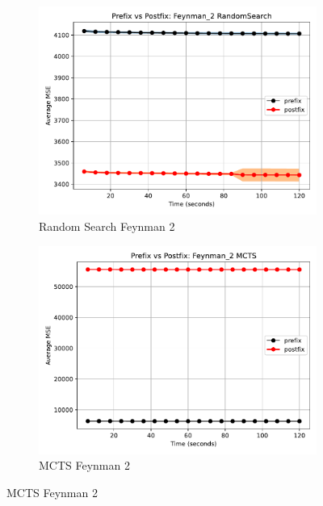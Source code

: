 \documentclass[12pt]{iopart}
\begin{document}
\begin{figure}
    \centering
    
    \begin{subfigure}[b]{0.4\textwidth}
        \includegraphics[width=\linewidth, keepaspectratio]{AIFeynman_Benchmarks/PrePostFeynman_2RandomSearch.pdf}
        \caption{Random Search Feynman 2}
        \label{subfig:feynman_2_RS}
    \end{subfigure}
    \begin{subfigure}[b]{0.4\textwidth}
        \includegraphics[width=\linewidth, keepaspectratio]{AIFeynman_Benchmarks/PrePostFeynman_2MCTS.pdf}
        \caption{MCTS Feynman 2}
        \label{subfig:feynman_2_MCTS}
    \end{subfigure}
    

\end{figure}
\end{document}
